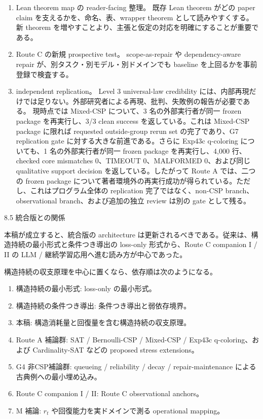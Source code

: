 \documentclass[12pt,a4paper]{article}
\begin{document}
\begin{enumerate}
\def\labelenumi{\arabic{enumi}.}
\setcounter{enumi}{2}
\item
  Lean theorem map の reader-facing 整理。 既存 Lean theorem がどの paper claim を支えるかを、命名、表、wrapper theorem として読みやすくする。新 theorem を増やすことより、主張と仮定の対応を明確にすることが重要である。
\item
  Route C の新規 prospective test。 scope-as-repair や dependency-aware repair が、別タスク・別モデル・別ドメインでも baseline を上回るかを事前登録で検査する。
\item
  independent replication。 Level 3 universal-law credibility には、内部再現だけでは足りない。外部研究者による再現、批判、失敗例の報告が必要である。 現時点では Mixed-CSP について、3 名の外部実行者が同一 frozen package を再実行し、3/3 clean success を返している。これは Mixed-CSP package に限れば requested outside-group rerun set の完了であり、G7 replication gate に対する大きな前進である。さらに Exp43c q-coloring についても、1 名の外部実行者が同一 frozen package を再実行し、4,000 行、checked core mismatches 0、TIMEOUT 0、MALFORMED 0、および同じ qualitative support decision を返している。したがって Route A では、二つの frozen package について著者環境外の再実行成功が得られている。ただし、これはプログラム全体の replication 完了ではなく、non-CSP branch、observational branch、および追加の独立 review は別の gate として残る。
\end{enumerate}

8.5 統合版との関係

本稿が成立すると、統合版の architecture は更新されるべきである。従来は、構造持続の最小形式と条件つき導出の loss-only 形式から、Route C companion I / II の LLM / 継続学習応用へ進む読み方が中心であった。

構造持続の収支原理を中心に置くなら、依存順は次のようになる。

\begin{enumerate}
\def\labelenumi{\arabic{enumi}.}
\tightlist
\item
  構造持続の最小形式: loss-only の最小形式。
\item
  構造持続の条件つき導出: 条件つき導出と弱依存境界。
\item
  本稿: 構造消耗量と回復量を含む構造持続の収支原理。
\item
  Route A 補論群: SAT / Bernoulli-CSP / Mixed-CSP / Exp43c q-coloring、および Cardinality-SAT などの proposed stress extensions。
\item
  G4 非CSP補論群: queueing / reliability / decay / repair-maintenance による古典例への最小埋め込み。
\item
  Route C companion I / II: Route C observational anchors。
\item
  M 補論: \(r_{t}\) や回復能力を実ドメインで測る operational mapping。
\end{enumerate}
\end{document}
